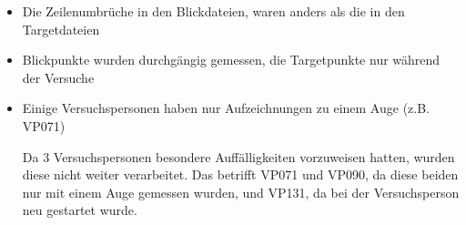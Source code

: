 \begin{itemize}
	\item Die Zeilenumbr\"uche in den Blickdateien, waren anders als die in den Targetdateien
	
	\item Blickpunkte wurden durchg\"angig gemessen, die Targetpunkte nur w\"ahrend der Versuche
	
	\item Einige Versuchspersonen haben nur Aufzeichnungen zu einem Auge (z.B. VP071)
	
	Da 3 Versuchspersonen besondere Auff\"alligkeiten vorzuweisen hatten, wurden diese nicht weiter verarbeitet. Das betrifft VP071 und VP090, da diese beiden nur mit einem Auge gemessen wurden, und VP131, da bei der Versuchsperson neu gestartet wurde.
	
\end{itemize}